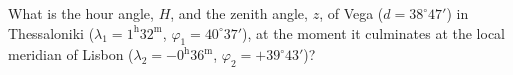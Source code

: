 What is the hour angle, $H$, and the zenith angle, $z$, of Vega
($d = 38^\circ 47'$) in Thessaloniki
($\lambda_1 = 1^{\mathrm{h}}32^{\mathrm{m}}$,
$\varphi_1 = 40^\circ 37'$), at the moment it culminates at the local meridian
of Lisbon ($\lambda_2 = -0^{\mathrm{h}}36^{\mathrm{m}}$,
$\varphi_2 = +39^\circ 43'$)?
